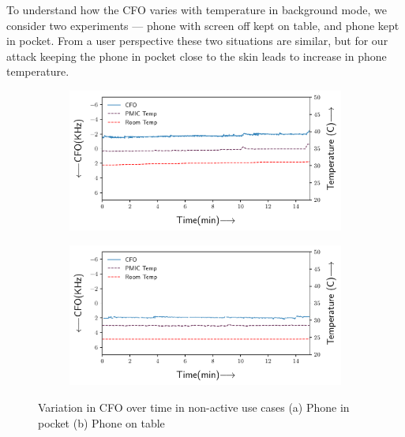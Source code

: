 To understand how the CFO varies with temperature in background mode, we consider two experiments --- phone with screen off kept on table, and phone kept in pocket.
%
From a user perspective these two situations are similar, but for our attack keeping the phone in pocket close to the skin leads to increase in phone temperature.
%
\begin{figure}
    \centering
    \begin{subfigure}[b]{1\linewidth}
       \includegraphics[width=1\linewidth]{plots/pocket_cfo.pdf}
       \caption{}
       \label{fig:pocketcfo} 
    \end{subfigure}
    
    \begin{subfigure}[b]{1\linewidth}
       \includegraphics[width=1\linewidth]{plots/table_cfo.pdf}
       \caption{}
       \label{fig:tablecfo1}
    \end{subfigure}
    \caption[Two numerical solutions]{Variation in CFO over time in non-active use cases (a) Phone in pocket (b) Phone on table}
\end{figure}

